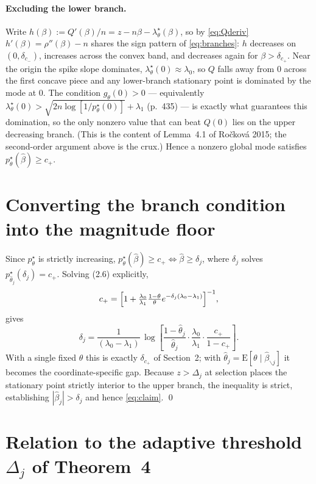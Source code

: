 \documentclass[11pt]{article}
\newcommand{\bhat}{\widehat{\beta}}
\newcommand{\pstar}{p^{\star}}
\newcommand{\lstar}{\lambda^{\star}}
\newcommand{\thetahat}{\widehat{\theta}}
\newcommand{\Estar}{\mathrm{E}}
\newcommand{\lamdiff}{(\lambda_0-\lambda_1)}
\newcommand{\betasub}{\bhat_{\backslash j}}
\begin{document}
\paragraph{Excluding the lower branch.}
Write $h(\beta) := Q'(\beta)/n = z - n\beta - \lstar_\theta(\beta)$, so by
\eqref{eq:Qderiv} $h'(\beta) = \rho''(\beta) - n$ shares the sign pattern of
\eqref{eq:branches}: $h$ decreases on $(0,\delta_{c_-})$, increases across the
convex band, and decreases again for $\beta > \delta_{c_+}$. Near the origin the
spike slope dominates, $\lstar_\theta(0)\approx\lambda_0$, so $Q$ falls away
from $0$ across the first concave piece and any lower-branch stationary point is
dominated by the mode at $0$. The condition $g_\theta(0)>0$ --- equivalently
$\lstar_\theta(0) > \sqrt{2n\log[1/\pstar_\theta(0)]} + \lambda_1$ (p.~435) ---
is exactly what guarantees this domination, so the only nonzero value that can
beat $Q(0)$ lies on the upper decreasing branch. (This is the content of
Lemma~4.1 of Ro\v{c}kov\'a 2015; the second-order argument above is the crux.)
Hence a nonzero global mode satisfies $\pstar_\theta(\bhat)\ge c_+$.

\section{Converting the branch condition into the magnitude floor}

Since $\pstar_\theta$ is strictly increasing,
$\pstar_\theta(\bhat)\ge c_+ \iff \bhat \ge \delta_j$, where $\delta_j$ solves
$\pstar_{\thetahat_j}(\delta_j)=c_+$. Solving (2.6) explicitly,
\begin{equation*}
  c_+ = \Bigl[1 + \tfrac{\lambda_0}{\lambda_1}\tfrac{1-\theta}{\theta}
        e^{-\delta_j\lamdiff}\Bigr]^{-1},
\end{equation*}
gives
\begin{equation}\label{eq:delta}
  \boxed{\;
  \delta_j = \frac{1}{\lamdiff}\,
    \log\!\left[
      \frac{1-\thetahat_j}{\thetahat_j}\cdot
      \frac{\lambda_0}{\lambda_1}\cdot
      \frac{c_+}{1-c_+}
    \right].
  \;}
\end{equation}
With a single fixed $\theta$ this is exactly $\delta_{c_+}$ of Section~2; with
$\thetahat_j = \Estar[\theta\mid\betasub]$ it becomes the coordinate-specific
gap. Because $z>\Delta_j$ at selection places the stationary point strictly
interior to the upper branch, the inequality is strict, establishing
$|\bhat_j| > \delta_j$ and hence \eqref{eq:claim}. \qed

\section{Relation to the adaptive threshold $\Delta_j$ of Theorem~4}
\end{document}
